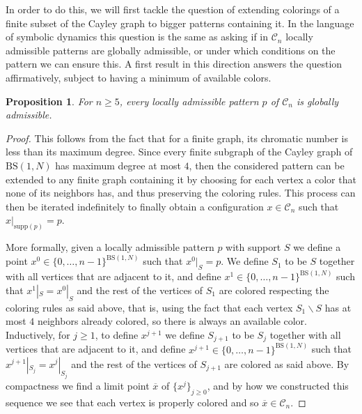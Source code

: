 \documentclass[cupthm,crop,info]{CUP-JNL-ETS}%
\theoremstyle{cupplain}
\newtheorem{proposition}[theorem]{Proposition}
\theoremstyle{cupdefinition}
\theoremstyle{cupremark}
\theoremstyle{cupproof}
\newtheorem{proof}{Proof}
\numberwithin{equation}{section}
\newcommand{\BS}[1][N]{\mathrm{BS}(1,#1)}
\begin{document}
In order to do this, we will first tackle the question of extending colorings of a finite subset of the Cayley graph to bigger patterns containing it. In the language of symbolic dynamics this question is the same as asking if in $\mathcal{C}_n$ locally admissible patterns are globally admissible, or under which conditions on the pattern we can ensure this. A first result in this direction answers the question affirmatively, subject to having a minimum of available colors.
\begin{proposition} \label{prop:loc_adm_5_colors}
	For $n\ge 5$, every locally admissible pattern $p$ of $\mathcal{C}_n$ is globally admissible.
\end{proposition}
\begin{proof}
	This follows from the fact that for a finite graph, its chromatic number is less than its maximum degree. Since every finite subgraph of the Cayley graph of $\BS$ has maximum degree at most $4$, then the considered pattern can be extended to any finite graph containing it by choosing for each vertex a color that none of its neighbors has, and thus preserving the coloring rules. This process can then be iterated indefinitely to finally obtain a configuration $x\in \mathcal{C}_n$ such that $x|_{\mathrm{supp}(p)}=p$. 
	
	More formally, given a locally admissible pattern $p$ with support $S$ we define a point $x^0\in \{0,\ldots,n-1\}^{\BS}$ such that $x^0|_{S}=p$. We define $S_1$ to be $S$ together with all vertices that are adjacent to it, and define $x^1\in \{0,\ldots,n-1\}^{\BS}$ such that $x^1|_{S}=x^0|_{S}$ and the rest of the vertices of $S_1$ are colored respecting the coloring rules as said above, that is, using the fact that each vertex $S_1\backslash S$ has at most $4$ neighbors already colored, so there is always an available color. Inductively, for $j\ge 1$, to define $x^{j+1}$ we define $S_{j+1}$ to be $S_j$ together with all vertices that are adjacent to it, and define $x^{j+1}\in \{0,\ldots,n-1\}^{\BS}$ such that $x^{j+1}|_{S_j}=x^j|_{S_j}$ and the rest of the vertices of $S_{j+1}$ are colored as said above. By compactness we find a limit point $\overline{x}$ of $\{x^j\}_{j\ge 0}$, and by how we constructed this sequence we see that each vertex is properly colored and so $\overline{x}\in \mathcal{C}_n$.
\end{proof}
\end{document}
